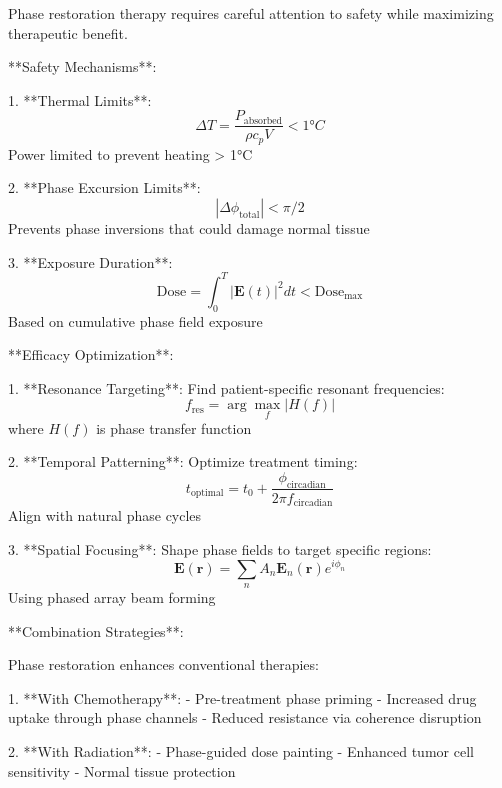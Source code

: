 \documentclass[12pt,a4paper]{report}
\begin{document}
Phase restoration therapy requires careful attention to safety while maximizing therapeutic benefit.

**Safety Mechanisms**:

1. **Thermal Limits**:
   \begin{equation}
   \Delta T = \frac{P_{\text{absorbed}}}{\rho c_p V} < 1°C
   \end{equation}
   Power limited to prevent heating > 1°C

2. **Phase Excursion Limits**:
   \begin{equation}
   |\Delta\phi_{\text{total}}| < \pi/2
   \end{equation}
   Prevents phase inversions that could damage normal tissue

3. **Exposure Duration**:
   \begin{equation}
   \text{Dose} = \int_0^T |\mathbf{E}(t)|^2 dt < \text{Dose}_{\text{max}}
   \end{equation}
   Based on cumulative phase field exposure

**Efficacy Optimization**:

1. **Resonance Targeting**:
   Find patient-specific resonant frequencies:
   \begin{equation}
   f_{\text{res}} = \arg\max_f |H(f)|
   \end{equation}
   where $H(f)$ is phase transfer function

2. **Temporal Patterning**:
   Optimize treatment timing:
   \begin{equation}
   t_{\text{optimal}} = t_0 + \frac{\phi_{\text{circadian}}}{2\pi f_{\text{circadian}}}
   \end{equation}
   Align with natural phase cycles

3. **Spatial Focusing**:
   Shape phase fields to target specific regions:
   \begin{equation}
   \mathbf{E}(\mathbf{r}) = \sum_n A_n \mathbf{E}_n(\mathbf{r}) e^{i\phi_n}
   \end{equation}
   Using phased array beam forming

**Combination Strategies**:

Phase restoration enhances conventional therapies:

1. **With Chemotherapy**:
   - Pre-treatment phase priming
   - Increased drug uptake through phase channels
   - Reduced resistance via coherence disruption

2. **With Radiation**:
   - Phase-guided dose painting
   - Enhanced tumor cell sensitivity
   - Normal tissue protection
\end{document}
